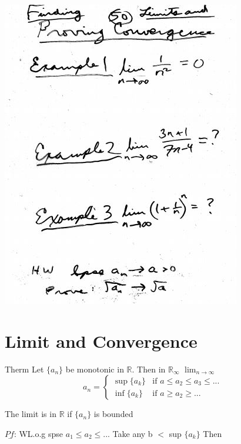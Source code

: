 \documentclass[10pt,a4paper]{article}
\begin{document}
{{\includegraphics[scale=.7]{Pages/S&L_page50}

\newpage












\section{Limit and Convergence}


Therm Let $\{ a_n \}$ be monotonic
in $\mathbb{R}$. Then in $\mathbb{R}_{\infty}$
$\lim_{n \rightarrow{\infty}}$
$$a_n = \begin{cases} 
\sup \{ a_k \} & \mbox{if } a \leq a_2 \leq a_3 \leq...\\
\inf \{ a_k \} & \mbox{if } a\geq a_2 \geq...
\end{cases}$$

The limit is in  $\mathbb{R}$ if $\{ a_n \}$ is bounded


$\underline{Pf}$: WL.o.g spse  $a_1 \leq a_2 \leq ...$ Take any b $<$ sup $\{ a_k \}$ Then 

}}
\end{document}

